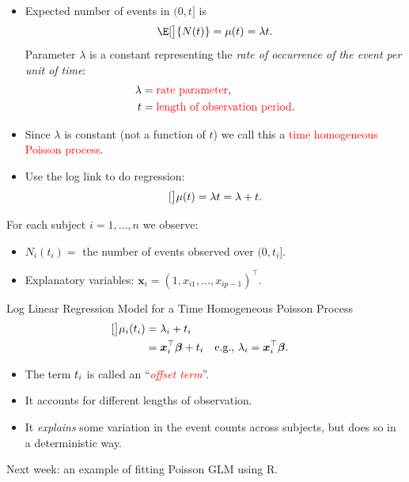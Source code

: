 \documentclass{article}\usepackage[]{graphicx}\usepackage[svgnames]{xcolor}
\let\log\relax%
\providecommand{\Vector}[1]{\bm{#1}}%
\begin{document}
\begin{itemize}
      \item Expected number of events in $ (0,t] $ is
            \[ \E[\big]{N(t)}=\mu(t)=\lambda t. \]
            Parameter $ \lambda $ is a constant representing the \emph{rate of occurrence of the event per unit of time}:
            \begin{align*}
                  \lambda & =\textcolor{Red}{\text{rate parameter}},               \\
                  t       & =\textcolor{Red}{\text{length of observation period}}.
            \end{align*}
      \item Since $ \lambda $ is constant (not a function of $t$) we call this a \textcolor{Red}{time homogeneous Poisson process}.
      \item Use the log link to do regression:
            \[ \log[\big]{\mu(t)}=\log{\lambda t}=\log{\lambda}+\log{t}. \]
\end{itemize}
For each subject $ i=1,\ldots, n $ we observe:
\begin{itemize}
      \item $ N_i(t_i)= $ the number of events observed over $ (0,t_i] $.
      \item Explanatory variables: $ \Vector{x}_i=(1,x_{i1},\ldots,x_{ip-1})^\top $.
\end{itemize}
\begin{Regular}{Log Linear Regression Model for a Time Homogeneous Poisson Process}
      \begin{align*}
            \log[\big]{\mu_i(t_i)}
             & =\log{\lambda_i}+\log{t_i}                                                                                          \\
             & =\Vector{x}_i^\top \Vector{\beta}+\log{t_i} &  & \text{e.g., $ \log{\lambda_i}=\Vector{x}_i^\top \Vector{\beta} $.}
      \end{align*}
\end{Regular}
\begin{itemize}
      \item The term $ \log{t_i} $ is called an ``\textcolor{Red}{\emph{offset term}}''.
      \item It accounts for different lengths of observation.
      \item It \emph{explains} some variation in the event counts across subjects, but does so in a deterministic way.
\end{itemize}
Next week: an example of fitting Poisson GLM using R.
\end{document}
